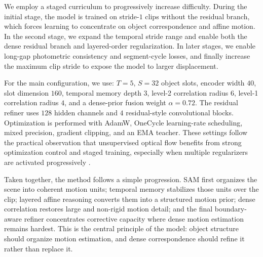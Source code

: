 We employ a staged curriculum to progressively increase difficulty. During the initial stage, the model is trained on stride-$1$ clips without the residual branch, which forces learning to concentrate on object correspondence and affine motion. In the second stage, we expand the temporal stride range and enable both the dense residual branch and layered-order regularization. In later stages, we enable long-gap photometric consistency and segment-cycle losses, and finally increase the maximum clip stride to expose the model to larger displacement.

For the main configuration, we use: $T=5$, $S=32$ object slots, encoder width $40$, slot dimension $160$, temporal memory depth $3$, level-2 correlation radius $6$, level-1 correlation radius $4$, and a dense-prior fusion weight $\alpha=0.72$. The residual refiner uses $128$ hidden channels and $4$ residual-style convolutional blocks. Optimization is performed with AdamW, OneCycle learning-rate scheduling, mixed precision, gradient clipping, and an EMA teacher. These settings follow the practical observation that unsupervised optical flow benefits from strong optimization control and staged training, especially when multiple regularizers are activated progressively \cite{unflow,ddflow}.

Taken together, the method follows a simple progression. SAM first organizes the scene into coherent motion units; temporal memory stabilizes those units over the clip; layered affine reasoning converts them into a structured motion prior; dense correlation restores large and non-rigid motion detail; and the final boundary-aware refiner concentrates corrective capacity where dense motion estimation remains hardest. This is the central principle of the model: object structure should organize motion estimation, and dense correspondence should refine it rather than replace it.
